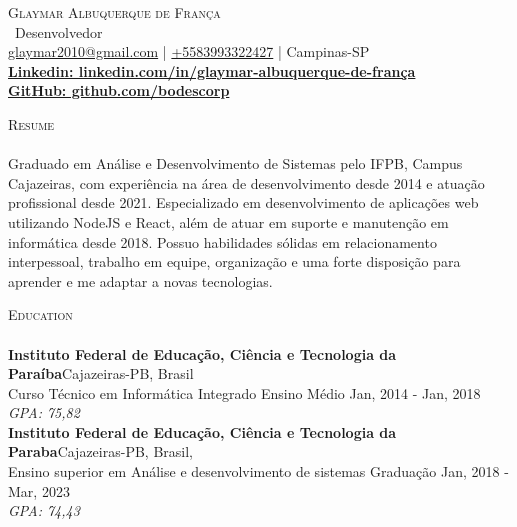 \documentclass[a4paper]{article}
\newcommand{\lineunder} {
    \vspace*{-8pt} \\
    \hspace*{-18pt} \hrulefill \\
}
\newcommand{\header} [1] {
    {\hspace*{-18pt}\vspace*{6pt} \textsc{#1}}
    \vspace*{-6pt} \lineunder
}
\begin{document}
\vspace*{-40pt}



%
%
\vspace*{-2pt}
\begin{center}
    {\Huge \scshape {Glaymar Albuquerque de França}}\\
    \vspace*{2pt}
    \ {Desenvolvedor}\\
    \vspace*{2pt}
    \href{mailto:glaymar2010@gmail.com}{glaymar2010@gmail.com} | \href{https://wa.me/+5583993322427}{+5583993322427} | Campinas-SP\\
    \vspace*{2pt}
    \textbf{\href{https://www.linkedin.com/in/glaymar-albuquerque-de-fran\%C3\%A7a/}{Linkedin: linkedin.com/in/glaymar-albuquerque-de-frança }} \\
    \textbf{\href{https://github.com/bodescorp}{GitHub: github.com/bodescorp }} \\
\end{center}

%
%
\header{Resume}
\vspace{2mm}
Graduado em Análise e Desenvolvimento de Sistemas pelo IFPB, Campus Cajazeiras, com experiência na área de desenvolvimento desde 2014 e atuação profissional desde 2021.
Especializado em desenvolvimento de aplicações web utilizando NodeJS e React, além de atuar em suporte e manutenção em informática desde 2018. Possuo habilidades sólidas
em relacionamento interpessoal, trabalho em equipe, organização e uma forte disposição para aprender e me adaptar a novas tecnologias.
\vspace{2mm}


%
%
\header{Education}
\vspace{2mm}
\textbf{Instituto Federal de Educação, Ciência e Tecnologia da Paraíba}\hfill Cajazeiras-PB, Brasil\\
Curso Técnico em Informática Integrado Ensino Médio \hfill Jan, 2014 - Jan, 2018\\
{\sl GPA: 75,82}\\
\vspace{2mm}
\textbf{Instituto Federal de Educação, Ciência e Tecnologia da Paraba}\hfill Cajazeiras-PB, Brasil,\\
Ensino superior em Análise e desenvolvimento de sistemas Graduação \hfill Jan, 2018 - Mar, 2023\\
{\sl GPA: 74,43}\\
\vspace{2mm}
\end{document}
